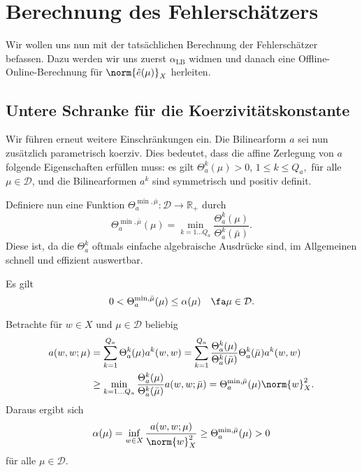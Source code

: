 
\section{Berechnung des Fehlerschätzers} %
\label{sec:berechnung_des_fehlersch_tzers}

Wir wollen uns nun mit der tatsächlichen Berechnung der Fehlerschätzer befassen.
Dazu werden wir uns zuerst $\alpha_\text{LB}$ widmen und danach eine Offline-Online-Berechnung für $\norm{\hat e(\mu)}_X$ herleiten.

\subsection{Untere Schranke für die Koerzivitätskonstante} %
\label{sub:untere_schranke_f_r_die_koerzivit_tskonstante}
Wir führen erneut weitere Einschränkungen ein. Die Bilinearform $a$ sei nun zusätzlich parametrisch koerziv. Dies bedeutet, dass die affine Zerlegung von $a$ folgende Eigenschaften erfüllen muss: es gilt $\Theta_a^k(\mu) > 0$, $1 \leq k \leq Q_a,$ für alle $\mu \in \mathcal D$, und die Bilinearformen $a^k$ sind symmetrisch und positiv definit.

Definiere nun eine Funktion $\Theta_a^{\min,\bar \mu} \colon \mathcal D \to \mathbb{R}_+$ durch
\begin{equation}
    \Theta_a^{\min, \bar \mu}(\mu) = \min_{k = 1 \ldots Q_a} \frac{\Theta_a^k(\mu)}{\Theta_a^k(\bar \mu)}.
\end{equation}
Diese ist, da die $\Theta_a^k$ oftmals einfache algebraische Ausdrücke sind, im Allgemeinen schnell und effizient auswertbar.

\begin{Satz}
    Es gilt
    \begin{equation}
        0 < \Theta_a^{\min, \bar \mu}(\mu) \leq \alpha(\mu) \quad \fa \mu \in \mathcal D.
    \end{equation}

    \begin{Beweis}
        Betrachte für $w \in X$ und $\mu \in \mathcal D$  beliebig
        \begin{align}
            a(w, w; \mu)
            &= \sum_{k=1}^{Q_a} \Theta_a^k(\mu) a^k(w, w)
            = \sum_{k=1}^{Q_a} \frac{\Theta_a^k(\mu)}{\Theta_a^k(\bar \mu)} \Theta_a^k(\bar \mu) a^k(w, w)
            \\
            &\geq \min_{k = 1 \ldots Q_a} \frac{\Theta_a^k(\mu)}{\Theta_a^k(\bar \mu)} a(w, w; \bar \mu)
            = \Theta_a^{\min, \bar \mu}(\mu) \norm{w}_X^2.
        \end{align}
        Daraus ergibt sich
        \begin{equation}
            \alpha(\mu) = \inf_{w \in X} \frac{a(w, w; \mu)}{\norm{w}^2_X} \geq \Theta_a^{\min, \bar \mu}(\mu) > 0
        \end{equation}
        für alle $\mu \in \mathcal D$.
    \end{Beweis}
\end{Satz}


